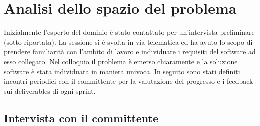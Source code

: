 \chapter{Analisi dello spazio del problema}

Inizialmente l'esperto del dominio è stato contattato per un'intervista preliminare (sotto riportata).
La sessione si è svolta in via telematica ed ha avuto lo scopo di prendere familiarità con l'ambito di lavoro e individuare i requisiti del software ad esso collegato. 
Nel colloquio il problema è emerso chiaramente e la soluzione software è stata individuata in maniera univoca.
In seguito sono stati definiti incontri periodici con il committente per la valutazione del progresso e i feedback sui deliverables di ogni sprint.

    \section{Intervista con il committente}
    \label{chap: IntervistaCommittente}
